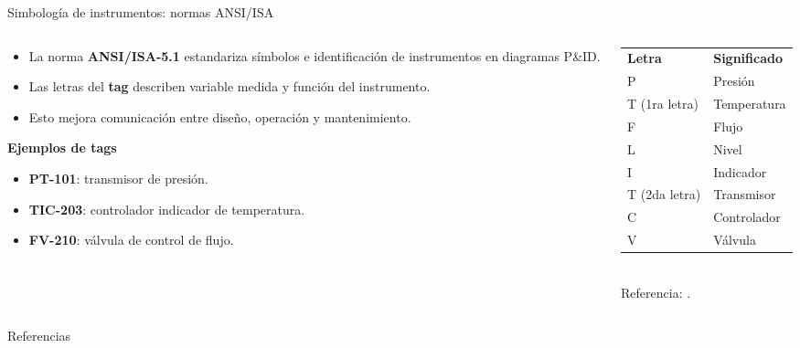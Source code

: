 \documentclass[aspectratio=169]{beamer}
\begin{document}
\begin{frame}{Simbología de instrumentos: normas ANSI/ISA}
    \begin{columns}[c, onlytextwidth]
        \begin{column}{0.56\textwidth}
            \begin{itemize}
                \item La norma \textbf{ANSI/ISA-5.1} estandariza símbolos e identificación de instrumentos en diagramas P\&ID.
                \item Las letras del \textbf{tag} describen variable medida y función del instrumento.
                \item Esto mejora comunicación entre diseño, operación y mantenimiento.
            \end{itemize}
            \vspace{6pt}
            \textbf{Ejemplos de tags}\\[4pt]
            \begin{itemize}
                \item \textbf{PT-101}: transmisor de presión.
                \item \textbf{TIC-203}: controlador indicador de temperatura.
                \item \textbf{FV-210}: válvula de control de flujo.
            \end{itemize}
        \end{column}
        \begin{column}{0.40\textwidth}
            \small
            \begin{tabular}{ll}
                \textbf{Letra} & \textbf{Significado} \\
                P & Presión \\
                T (1ra letra) & Temperatura \\
                F & Flujo \\
                L & Nivel \\
                I & Indicador \\
                T (2da letra) & Transmisor \\
                C & Controlador \\
                V & Válvula \\
            \end{tabular}\\[10pt]
            \tiny{Referencia: \cite{ansi_isa_5_1}.}
        \end{column}
    \end{columns}
\end{frame}


\begin{frame}{Referencias}
\footnotesize
\printbibliography[heading=none]
\end{frame}
\end{document}
